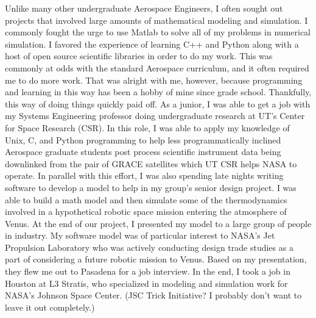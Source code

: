 \documentclass{article}
\begin{document}
Unlike many other undergraduate Aerospace Engineers, I often sought out projects that involved
large amounts of mathematical modeling and simulation. I commonly fought the urge
to use Matlab to solve all of my problems in numerical simulation. I favored the experience of learning
C++ and Python along with a host of open source scientific libraries in order to do my work. This 
was commonly at odds with the standard Aerospace curriculum, and it often required me to do more work.
That was alright with me, however, because programming and learning in this way has been a hobby of mine
since grade school. Thankfully, this way of doing things quickly paid off. As a junior, I was able to get
a job with my Systems Engineering professor doing undergraduate research at UT's Center for Space Research (CSR).
In this role, I was able to apply my knowledge of Unix, C, and Python programming to help less
programmatically inclined Aerospace graduate students post process scientific instrument data being downlinked
from the pair of GRACE satellites which UT CSR helps NASA to operate. In parallel with this effort,
I was also spending late nights writing software to develop a model to help in my group's senior design project.
I was able to build a math model and then simulate some of the thermodynamics involved in a hypothetical
robotic space mission entering the atmosphere of Venus. At the end of our project, I presented my model to a
large group of people in industry. My software model was of particular interest to NASA's Jet Propulsion
Laboratory who was actively conducting design trade studies as a part of considering a future robotic 
mission to Venus. Based on my presentation, they flew me out to Pasadena for a job interview. In the end,
I took a job in Houston at L3 Stratis, who specialized in modeling and simulation work for NASA's Johnson
Space Center. (JSC Trick Initiative? I probably don't want to leave it out completely.)
\end{document}
